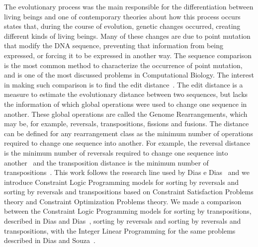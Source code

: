 The evolutionary process was the main responsible for the
differentiation between living beings and one of contemporary theories
about how this process occurs states that, during the course of
evolution, genetic changes occurred, creating different kinds of
living beings. Many of these changes are due to point mutation that
modify the DNA sequence, preventing that information from being
expressed, or forcing it to be expressed in another way. The sequence
comparison is the most common method to characterize the occurrence of
point mutation, and is one of the most discussed problems in
Computational Biology. The interest in making such comparison is to
find the edit distance~\cite{SetubalMeidanis*1997}. The edit distance
is a measure to estimate the evolutionary distance between two
sequences, but lacks the information of which global operations were
used to change one sequence in another. These global operations are
called the Genome Rearrangements, which may be, for example,
reversals, transpositions, fissions and fusions. The distance can be
defined for any rearrangement class as the minimum number of
operations required to change one sequence into another. For example,
the reversal distance is the minimum number of reversals required to
change one sequence into another~\cite{BafnaPevzner*1996} and the
transposition distance is the minimum number of
transpositions~\cite{BafnaPevzner*1998}. This work follows the
research line used by Dias e Dias~\cite{DiasDias*2009} and we
introduce Constraint Logic Programming models for sorting by reversals
and sorting by reversals and transpositions based on Constraint
Satisfaction Problems theory and Constraint Optimization Problems
theory. We made a comparison between the Constraint Logic Programming
models for sorting by transpositions, described in Dias and
Dias~\cite{DiasDias*2009}, sorting by reversals and sorting by
reversals and transpositions, with the Integer Linear Programming for
the same problems described in Dias and Souza~\cite{DiasSouza*2007}.

